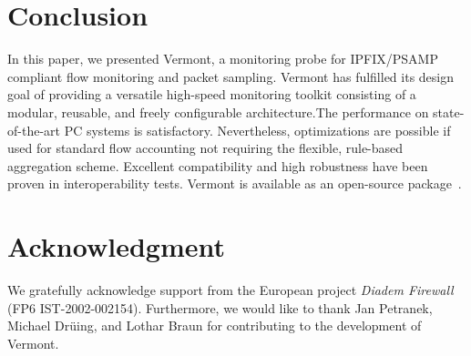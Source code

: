 \section{Conclusion}
\label{sec:conclusion}

In this paper, we presented Vermont, a monitoring probe for IPFIX/PSAMP compliant flow monitoring and packet sampling. Vermont has fulfilled its design goal of providing a versatile high-speed monitoring toolkit consisting of a modular, reusable, and freely configurable architecture.The performance on state-of-the-art PC systems is satisfactory. Nevertheless, optimizations are possible if used for standard flow accounting not requiring the flexible, rule-based aggregation scheme. Excellent compatibility and high robustness have been proven in interoperability tests. Vermont is available as an open-source package~\cite{vermont-site}.


\section*{Acknowledgment}
We gratefully acknowledge support from the European project \emph{Diadem Firewall} (FP6 IST-2002-002154). 
Furthermore, we would like to thank Jan Petranek, Michael Dr\"uing, and Lothar Braun for contributing to the development of Vermont.
